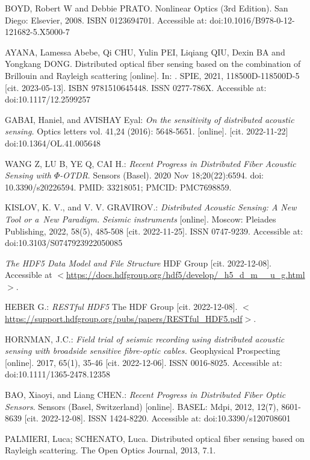 \begin{thebibliography}{99}
BOYD, Robert W and Debbie PRATO. Nonlinear Optics (3rd Edition). San Diego: Elsevier, 2008. ISBN 0123694701. Accessible at: doi:10.1016/B978-0-12-121682-5.X5000-7

AYANA, Lamessa Abebe, Qi CHU, Yulin PEI, Liqiang QIU, Dexin BA and Yongkang DONG. Distributed optical fiber sensing based on the combination of Brillouin and Rayleigh scattering [online]. In: . SPIE, 2021, 118500D-118500D-5 [cit. 2023-05-13]. ISBN 9781510645448. ISSN 0277-786X. Accessible at: doi:10.1117/12.2599257

GABAI, Haniel, and AVISHAY Eyal: \emph{On the sensitivity of distributed acoustic sensing.} Optics letters vol. 41,24 (2016): 5648-5651. [online]. [cit. 2022-11-22] doi:10.1364/OL.41.005648

WANG Z, LU B, YE Q, CAI H.: \emph{Recent Progress in Distributed Fiber Acoustic Sensing with $\Phi$-OTDR}. Sensors (Basel). 2020 Nov 18;20(22):6594. doi: 10.3390/s20226594. PMID: 33218051; PMCID: PMC7698859.

KISLOV, K. V.,  and V. V. GRAVIROV.: \emph{Distributed Acoustic Sensing: A New Tool or a~New Paradigm. Seismic instruments} [online]. Moscow: Pleiades Publishing, 2022, 58(5), 485-508 [cit. 2022-11-25]. ISSN 0747-9239. Accessible at: doi:10.3103/S0747923922050085

\emph{The HDF5 Data Model and File Structure} HDF Group [cit. 2022-12-08]. Accessible at \(<\)\url{https://docs.hdfgroup.org/hdf5/develop/_h5_d_m__u_g.html}\(>\).

HEBER G.: \emph{RESTful HDF5} The HDF Group [cit. 2022-12-08].
\(<\)\url{https://support.hdfgroup.org/pubs/papers/RESTful_HDF5.pdf}\(>\).

HORNMAN, J.C.: \emph{Field trial of seismic recording using distributed acoustic sensing with broadside sensitive fibre-optic cables.} Geophysical Prospecting [online]. 2017, 65(1), 35-46 [cit. 2022-12-06]. ISSN 0016-8025. Accessible at: doi:10.1111/1365-2478.12358

BAO, Xiaoyi, and Liang CHEN.: \emph{Recent Progress in Distributed Fiber Optic Sensors}. Sensors (Basel, Switzerland) [online]. BASEL: Mdpi, 2012, 12(7), 8601-8639 [cit. 2022-12-08]. ISSN 1424-8220. Accessible at: doi:10.3390/s120708601

PALMIERI, Luca; SCHENATO, Luca. Distributed optical fiber sensing based on Rayleigh scattering. The Open Optics Journal, 2013, 7.1.


\end{thebibliography}
